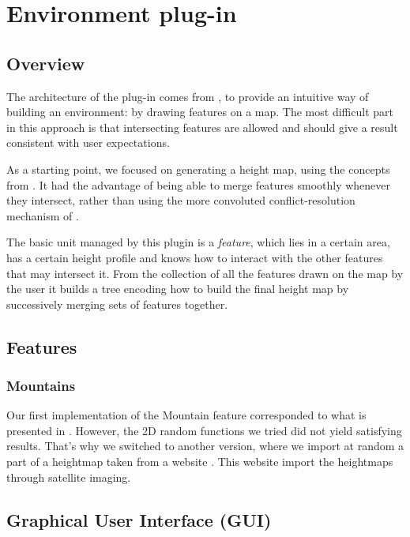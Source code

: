 \section{Environment plug-in}

\subsection{Overview}

The architecture of the plug-in comes from \cite{DeclarativeArchitecture}, to
provide an intuitive way of building an environment: by drawing features on a
map. The most difficult part in this approach is that intersecting features are
allowed and should give a result consistent with user expectations.

As a starting point, we focused on generating a height map, using the concepts
from \cite{FeatureTree}. It had the advantage of being able to merge features
smoothly whenever they intersect, rather than using the more convoluted
conflict-resolution mechanism of \cite{DeclarativeArchitecture}.

\bigskip

The basic unit managed by this plugin is a \emph{feature}, which lies in a
certain area, has a certain height profile and knows how to interact with the
other features that may intersect it. From the collection of all the features
drawn on the map by the user it builds a tree encoding how to build the final
height map by successively merging sets of features together.


\subsection{Features}

\subsubsection{Mountains}

Our first implementation of the Mountain feature corresponded to what is presented in \cite{FeatureTree}. However, the 2D random functions we tried did not yield satisfying results. That's why we switched to another version, where we import at random a part of a heightmap taken from a website \cite{terrain-party}. This website import the heightmaps through satellite imaging.

\subsection{Graphical User Interface (GUI)}

